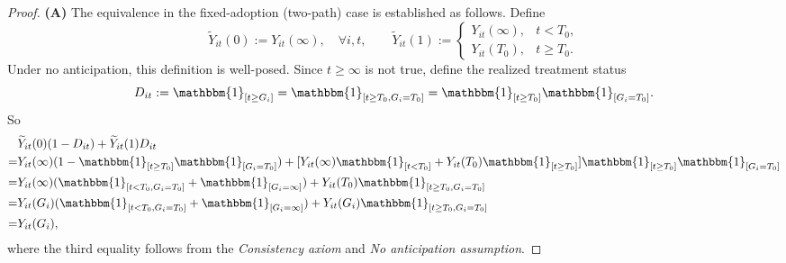 \documentclass[12pt]{article}
\renewcommand{\(}{\left(}%
\renewcommand{\)}{\right)}%
\renewcommand{\[}{\left[}%
\renewcommand{\]}{\right]}%
\newtheorem{proof}{Proof.}}
\begin{document}
\begin{proof}
\textbf{(A)}
The equivalence in the fixed-adoption (two-path) case is established as follows.
Define
\begin{equation*}
\widetilde Y_{it}(0):= Y_{it}(\infty),\quad \forall i,t,
\qquad
\widetilde Y_{it}(1):=
\begin{cases}
Y_{it}(\infty), & t<T_0,\\
Y_{it}(T_0), & t\ge T_0 .
\end{cases}
\end{equation*}
Under no anticipation, this definition is well-posed.
Since $t\geq \infty$ is not true, define the realized treatment status
\begin{equation*}
	D_{it}:=\mathbbm{1}_{[t\ge G_i]}=\mathbbm{1}_{[t\geq T_0,G_i=T_0]}=\mathbbm{1}_{[t\ge T_0]}\mathbbm{1}_{[G_i=T_0]}.
\end{equation*}
So
\begin{equation*}
	\begin{split}
		&\widetilde Y_{it}(0)(1-D_{it})+\widetilde Y_{it}(1)D_{it}\\
		=&Y_{it}(\infty)(1-\mathbbm{1}_{[t\ge T_0]}\mathbbm{1}_{[G_i=T_0]})+[Y_{it}(\infty)\mathbbm{1}_{[t<T_0]}+Y_{it}(T_0)\mathbbm{1}_{[t\geq T_0]}]\mathbbm{1}_{[t\ge T_0]}\mathbbm{1}_{[G_i=T_0]}\\
		=&Y_{it}(\infty)(\mathbbm{1}_{[t< T_0,G_i=T_0]}+\mathbbm{1}_{[G_i=\infty]})+Y_{it}(T_0)\mathbbm{1}_{[t\ge T_0,G_i=T_0]}\\
		=&Y_{it}(G_i)(\mathbbm{1}_{[t< T_0,G_i=T_0]}+\mathbbm{1}_{[G_i=\infty]})+Y_{it}(G_i)\mathbbm{1}_{[t\ge T_0,G_i=T_0]}\\
		=&Y_{it}(G_i),
	\end{split}
\end{equation*}
where the third equality follows from the \emph{Consistency axiom} and \emph{No anticipation assumption}. 


\end{proof}
\end{document}
